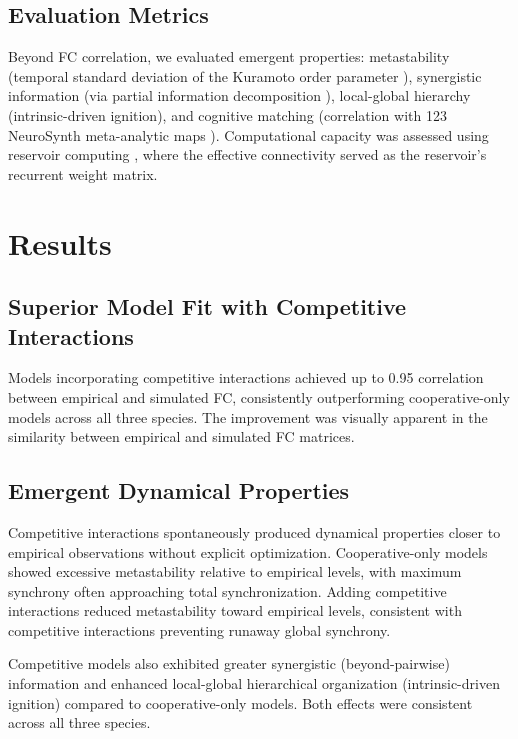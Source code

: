\documentclass[11pt]{article}
\begin{document}
\subsection{Evaluation Metrics}

Beyond FC correlation, we evaluated emergent properties: metastability (temporal standard deviation of the Kuramoto order parameter \citep{kuramoto1975self}), synergistic information (via partial information decomposition \citep{williams2010nonnegative}), local-global hierarchy (intrinsic-driven ignition), and cognitive matching (correlation with 123 NeuroSynth meta-analytic maps \citep{yarkoni2011neurosynth}). Computational capacity was assessed using reservoir computing \citep{jaeger2004harnessing}, where the effective connectivity served as the reservoir's recurrent weight matrix.

\section{Results}

\subsection{Superior Model Fit with Competitive Interactions}

Models incorporating competitive interactions achieved up to 0.95 correlation between empirical and simulated FC, consistently outperforming cooperative-only models across all three species. The improvement was visually apparent in the similarity between empirical and simulated FC matrices.

\subsection{Emergent Dynamical Properties}

Competitive interactions spontaneously produced dynamical properties closer to empirical observations without explicit optimization. Cooperative-only models showed excessive metastability relative to empirical levels, with maximum synchrony often approaching total synchronization. Adding competitive interactions reduced metastability toward empirical levels, consistent with competitive interactions preventing runaway global synchrony.

Competitive models also exhibited greater synergistic (beyond-pairwise) information and enhanced local-global hierarchical organization (intrinsic-driven ignition) compared to cooperative-only models. Both effects were consistent across all three species.
\end{document}
